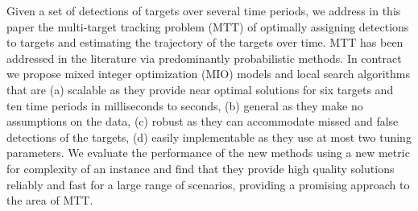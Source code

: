 Given a set of detections of targets over several time periods, we address in this paper the multi-target tracking problem (MTT) of optimally assigning detections to targets and estimating the trajectory of the targets over time. MTT has been addressed in the literature via predominantly probabilistic methods. In contract we propose mixed integer optimization (MIO) models and local search algorithms that are (a)  scalable as they provide near optimal solutions for {\color{red} six targets and ten time periods} in milliseconds to seconds, (b) general as they make no assumptions on the data, (c) robust as they can accommodate missed and false detections of the targets, (d) easily implementable as they use at most two tuning parameters. We evaluate the performance of the new methods using a new metric for complexity of an instance and find that they provide high quality solutions reliably and fast for a large range of scenarios, providing a promising approach to the area of MTT. 
